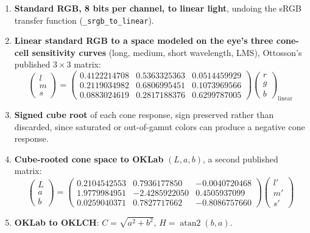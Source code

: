 \documentclass[11pt]{article}
\begin{document}
\begin{enumerate}[leftmargin=1.6em]
\item \textbf{Standard RGB, 8 bits per channel, to linear light}, undoing
  the sRGB transfer function (\texttt{\_srgb\_to\_linear}).
\item \textbf{Linear standard RGB to a space modeled on the eye's three
  cone-cell sensitivity curves} (long, medium, short wavelength, LMS),
  Ottosson's published $3\times3$ matrix:
\[
\begin{pmatrix}l\\m\\s\end{pmatrix} =
\begin{pmatrix}
0.4122214708 & 0.5363325363 & 0.0514459929\\
0.2119034982 & 0.6806995451 & 0.1073969566\\
0.0883024619 & 0.2817188376 & 0.6299787005
\end{pmatrix}
\begin{pmatrix}r\\g\\b\end{pmatrix}_{\text{linear}}
\]
\item \textbf{Signed cube root} of each cone response, sign preserved
  rather than discarded, since saturated or out-of-gamut colors can
  produce a negative cone response.
\item \textbf{Cube-rooted cone space to OKLab} $(L, a, b)$, a second
  published matrix:
\[
\begin{pmatrix}L\\a\\b\end{pmatrix} =
\begin{pmatrix}
0.2104542553 & 0.7936177850 & -0.0040720468\\
1.9779984951 & -2.4285922050 & 0.4505937099\\
0.0259040371 & 0.7827717662 & -0.8086757660
\end{pmatrix}
\begin{pmatrix}l'\\m'\\s'\end{pmatrix}
\]
\item \textbf{OKLab to OKLCH}: $C = \sqrt{a^2+b^2}$, $H = \operatorname{atan2}(b, a)$.
\end{enumerate}
\end{document}
